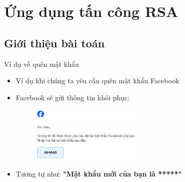 \section{Ứng dụng tấn công RSA}

\subsection{Giới thiệu bài toán}


\begin{frame}{Ví dụ về quên mật khẩu}
    


    \begin{itemize}
        \item  Ví dụ khi chúng ta yêu cầu quên mật khẩu Facebook
        \item   Facebook sẽ gửi thông tin khôi phục:
        
        \begin{figure}[h]
            \includegraphics[width=0.5\textwidth]{pictures/facebook.png}
        \end{figure}
        
        \item           Tương tự như:
        \textbf{"Mật khẩu mới của bạn là *****"}
    \end{itemize}
        
    \end{frame}









% 

